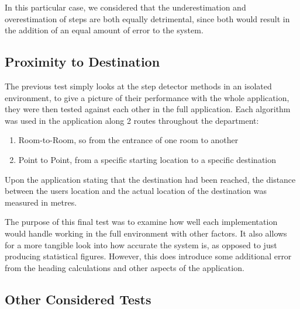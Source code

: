 \documentclass[main.tex]{subfiles}
\begin{document}
In this particular case, we considered that the underestimation and overestimation of steps are both equally detrimental, since both would result in the addition of an equal amount of error to the system.


\subsection{Proximity to Destination}

The previous test simply looks at the step detector methods in an isolated environment, to give a picture of their performance with the whole application, they were then tested against each other in the full application. Each algorithm was used in the application along 2 routes throughout the department:

\begin{enumerate}
	\item Room-to-Room, so from the entrance of one room to another  %
	\item Point to Point, from a specific starting location to a specific destination  %
\end{enumerate}

Upon the application stating that the destination had been reached, the distance between the users location and the actual location of the destination was measured in metres.

The purpose of this final test was to examine how well each implementation would handle working in the full environment with other factors. It also allows for a more tangible look into how accurate the system is, as opposed to just producing statistical figures. However, this does introduce some additional error from the heading calculations and other aspects of the application.


\subsection{Other Considered Tests}
\end{document}
